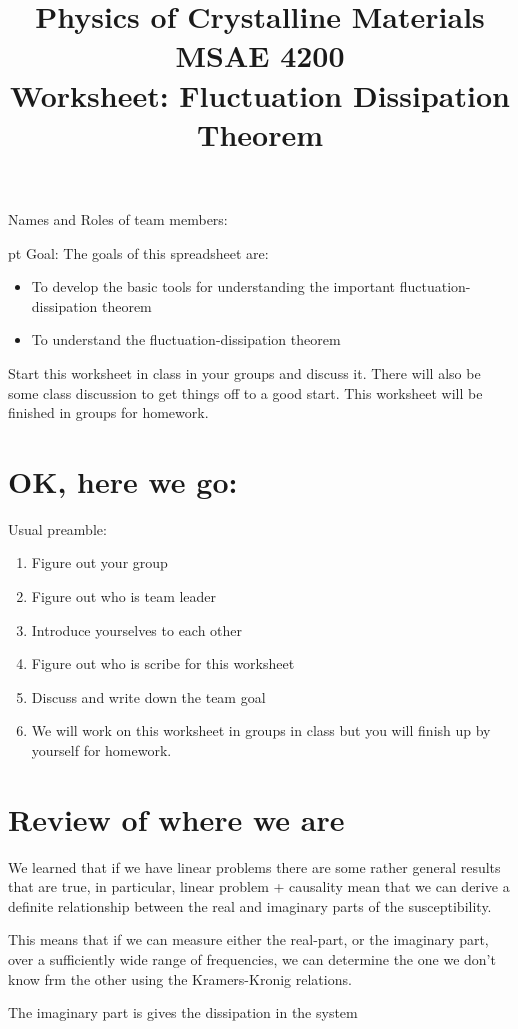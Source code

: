 \documentclass[]{revtex4}
\begin{document}
\title{Physics of Crystalline Materials\\
MSAE 4200\\
Worksheet: Fluctuation Dissipation Theorem}

\maketitle

\vskip 24pt
{Names and Roles of team members:}

 pt
Goal: The goals of this spreadsheet are:
\begin{itemize}
\item To develop the basic tools for understanding the important fluctuation-dissipation theorem
\item To understand the fluctuation-dissipation theorem
\end{itemize}

\cork{}
\vskip 12pt



Start this worksheet in class in your groups and discuss it.  There will also be some class discussion to get things off to a good start.
This worksheet will be finished in groups for  homework.

\section*{OK, here we go:}
Usual preamble:
\begin{enumerate}
  \item Figure out your group
  \item Figure out who is team leader
  \item Introduce yourselves to each other
  \item Figure out who is scribe for this worksheet
  \item Discuss and write down the team goal
  \item We will work on this worksheet in groups in class but you will finish up by yourself for homework.
\end{enumerate}

\section*{Review of where we are}
\bi
\item We learned that if we have linear problems there are some rather general results that are true, in particular, linear problem + causality
mean that we can derive a definite relationship between the real and imaginary parts of the susceptibility.
\item This means that if we can measure either the real-part, or the imaginary part, over a sufficiently wide range of frequencies,
we can determine the one we don't know frm the other using the Kramers-Kronig relations.
\item The imaginary part is gives the dissipation in the system
\ei
\end{document}
